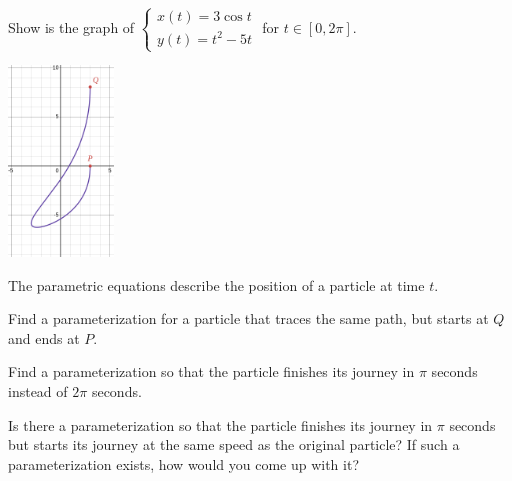\documentclass{workbook}
\begin{document}
\begin{slide}
	\question

		Show is the graph of $\displaystyle
		\begin{cases}
			x(t)=3\cos t \\
			y(t)=t^2-5t
		\end{cases}
		$
		for $t\in[0,2\pi]$.
		\begin{center}
	\includegraphics[height=2in]{images/parametric1.png}
		\end{center}

	
	The parametric equations describe the position of a particle at time $t$.

	\begin{parts}
		\item Find a parameterization for a particle that traces the same path,
		but starts at $Q$ and ends at $P$.

		\item Find a parameterization so that the particle finishes its journey in $\pi$ seconds instead of $2\pi$ seconds.

		\item Is there a parameterization so that the particle
		finishes its journey in $\pi$ seconds but starts its journey at
		the same speed as the original particle? If such a parameterization exists, how would you come up with it?
		
	\end{parts}
\end{slide}
\end{document}
